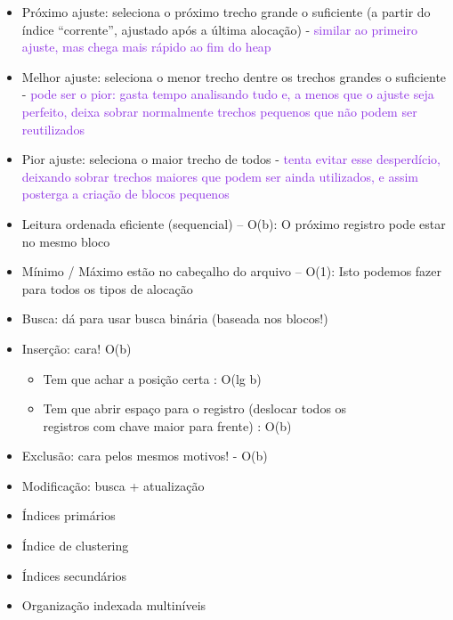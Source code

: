 \documentclass[a4paper, 12pt]{article}
\begin{document}
\begin{itemize}
\begin{itemize}
\begin{itemize}
\item Próximo ajuste: seleciona o próximo trecho grande o suficiente (a partir do índice
“corrente”, ajustado após a última alocação) - \textcolor{BlueViolet}{similar ao primeiro ajuste, mas chega mais rápido ao fim do
heap}

\item Melhor ajuste: seleciona o menor trecho dentre os trechos grandes o suficiente - \textcolor{BlueViolet}{pode ser o pior: gasta tempo analisando tudo e, a menos que o ajuste seja perfeito, deixa sobrar normalmente trechos pequenos que não
podem ser reutilizados}

\item Pior ajuste: seleciona o maior trecho de todos - \textcolor{BlueViolet}{tenta evitar esse desperdício, deixando sobrar trechos maiores que podem ser ainda utilizados, e assim posterga a criação de blocos
pequenos}
\end{itemize}

\end{itemize}


\begin{itemize}
\item Leitura ordenada eficiente (sequencial) – O(b): O próximo registro pode estar no mesmo bloco
\item Mínimo / Máximo estão no cabeçalho do arquivo –
O(1): Isto podemos fazer para todos os tipos de alocação
\item Busca: dá para usar busca binária (baseada nos blocos!)
\item Inserção: cara! O(b)
\begin{itemize}
\item Tem que achar a posição certa : O(lg b)
\item Tem que abrir espaço para o registro (deslocar
todos os\\ registros com chave maior para frente) :
O(b)
\end{itemize}

\item Exclusão: cara pelos mesmos motivos! - O(b)
\item Modificação: busca + atualização
\end{itemize}


\color{red}
\begin{itemize}
\item Índices primários
\item Índice de clustering
\item Índices secundários
\item Organização indexada multiníveis
\end{itemize}

\color{black}
\end{itemize}
\end{document}
